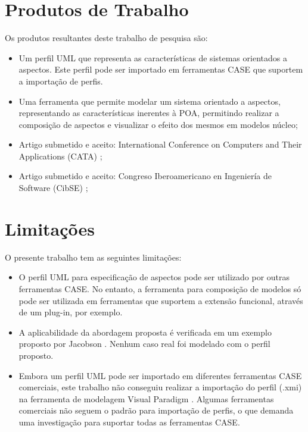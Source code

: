 \section{Produtos de Trabalho}

Os produtos resultantes deste trabalho de pesquisa são:

\begin{itemize}
  \item Um perfil UML que representa as características de sistemas orientados a aspectos. Este perfil pode ser importado em ferramentas CASE
  que suportem a importação de perfis.
  \item Uma ferramenta que permite modelar um sistema orientado a aspectos, representando as características inerentes à POA,
  permitindo realizar a composição de aspectos e visualizar o efeito dos mesmos em modelos núcleo;
  \item Artigo submetido e aceito: International Conference on Computers and Their Applications (CATA) \cite{ghilardi_cata:13};
  \item Artigo submetido e aceito: Congreso Iberoamericano en Ingeniería de Software (CibSE) \cite{ghilardi_cibse:13};
\end{itemize}

\section{Limitações}

O presente trabalho tem as seguintes limitações:

\begin{itemize}
  \item O perfil UML para especificação de aspectos pode ser utilizado por outras ferramentas CASE. No entanto, a ferramenta para composição de
  modelos só pode ser utilizada em ferramentas que suportem a extensão funcional, através de um plug-in, por exemplo.
  \item A aplicabilidade da abordagem proposta é verificada em um exemplo proposto por Jacobson \cite{Jacobson:2004:ASD:1062430}. Nenhum
  caso real foi modelado com o perfil proposto.
  \item Embora um perfil UML pode ser importado em diferentes ferramentas CASE comerciais, este trabalho não conseguiu realizar a importação do perfil
  (.xmi) na ferramenta de modelagem Visual Paradigm \cite{VisualParadigm11}. Algumas ferramentas comerciais não seguem o padrão para importação de
  perfis, o que demanda uma investigação para suportar todas as ferramentas CASE.	
\end{itemize}

